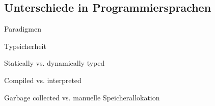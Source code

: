 \subsection{Unterschiede in Programmiersprachen}

\begin{frame}{Paradigmen}

\end{frame}

\begin{frame}{Typsicherheit}

\end{frame}

\begin{frame}{Statically vs. dynamically typed}

\end{frame}

\begin{frame}{Compiled vs. interpreted}

\end{frame}

\begin{frame}{Garbage collected vs. manuelle Speicherallokation}

\end{frame}